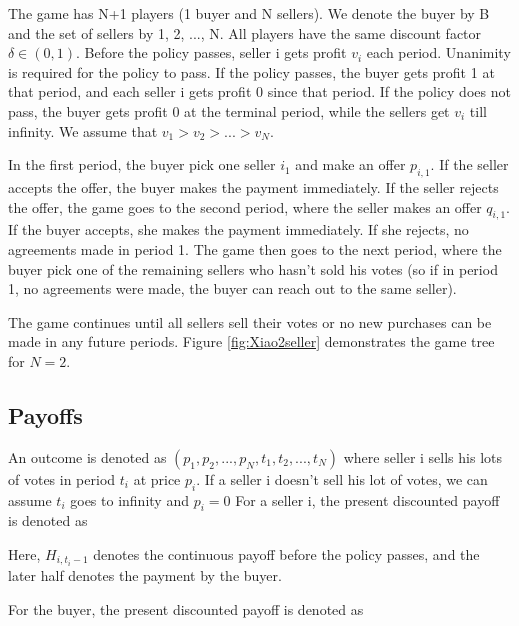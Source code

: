 \documentclass[ProjectGAZ]{subfiles}
\begin{document}
The game has N+1 players (1 buyer and N sellers). We denote the buyer by B and the set of sellers by {1, 2, ..., N}. All players have the same discount factor $\delta \in (0, 1)$. Before the policy passes, seller i gets profit $v_i$ each period. Unanimity is required for the policy to pass. If the policy passes, the buyer gets profit 1 at that period, and each seller i gets profit 0 since that period. If the policy does not pass, the buyer gets profit 0 at the terminal period, while the sellers get $v_i$ till infinity. We assume that $v_1 > v_2 > ... > v_N$.

In the first period, the buyer pick one seller $i_1$ and make an offer $p_{i,1}$. If the seller accepts the offer, the buyer makes the payment immediately. If the seller rejects the offer, the game goes to the second period, where the seller makes an offer $q_{i, 1}$. If the buyer accepts, she makes the payment immediately. If she rejects, no agreements made in period 1. The game then goes to the next period, where the buyer pick one of the remaining sellers who hasn't sold his votes (so if in period 1, no agreements were made, the buyer can reach out to the same seller).

The game continues until all sellers sell their votes or no new purchases can be made in any future periods. Figure \ref{fig:Xiao2seller} demonstrates the game tree for $N = 2$.

\providecommand{\figName}{Xiao2seller}
\providecommand{\figFile}{\figName}
\hypertarget{\figFile}{}



\subsection{Payoffs}\label{subsec:Xiao-Payoff}

An outcome is denoted as $(p_1, p_2, ..., p_N, t_1, t_2, ..., t_N)$ where seller i sells his lots of votes in period $t_i$ at price $p_i$. If a seller i doesn't sell his lot of votes, we can assume $t_i$ goes to infinity and $p_i= 0$  For a seller i, the present discounted payoff is denoted as



Here, $H_{i, t_i-1}$ denotes the continuous payoff before the policy passes, and the later half denotes the payment by the buyer.

For the buyer, the present discounted payoff is denoted as 


\end{document}

